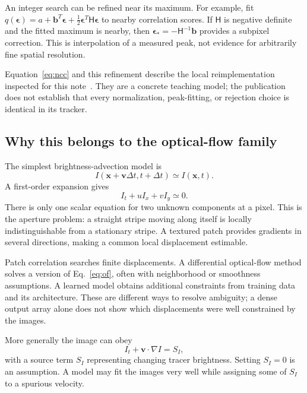 \documentclass[11pt]{article}
\newcommand{\vel}{\bm{v}}
\newcommand{\pos}{\bm{x}}
\begin{document}
An integer search can be refined near its maximum. For example, fit
$q(\bm{\epsilon})=a+\bm{b}^{T}\bm{\epsilon}
+\tfrac12\bm{\epsilon}^{T}\mathsf{H}\bm{\epsilon}$ to nearby correlation
scores. If $\mathsf{H}$ is negative definite and the fitted maximum is nearby,
then $\bm{\epsilon}_*=-\mathsf{H}^{-1}\bm{b}$ provides a subpixel correction.
This is interpolation of a measured peak, not evidence for arbitrarily fine
spatial resolution.

Equation~\eqref{eq:ncc} and this refinement describe the local
reimplementation inspected for this note~\cite{repotracker}. They are a
concrete teaching model; the publication does not establish that every
normalization, peak-fitting, or rejection choice is identical in its tracker.

\subsection{Why this belongs to the optical-flow family}

The simplest brightness-advection model is
\begin{equation}\label{eq:advect}
 I(\pos+\vel\Delta t,t+\Delta t)\simeq I(\pos,t).
\end{equation}
A first-order expansion gives
\begin{equation}\label{eq:of}
 I_t+uI_x+vI_y\simeq0.
\end{equation}
There is only one scalar equation for two unknown components at a pixel.
This is the aperture problem: a straight stripe moving along itself is
locally indistinguishable from a stationary stripe. A textured patch
provides gradients in several directions, making a common local displacement
estimable.

Patch correlation searches finite displacements. A differential optical-flow
method solves a version of Eq.~\eqref{eq:of}, often with neighborhood or
smoothness assumptions. A learned model obtains additional constraints from
training data and its architecture. These are different ways to resolve
ambiguity; a dense output array alone does not show which displacements were
well constrained by the images.

More generally the image can obey
\begin{equation}
 I_t+\vel\cdot\nabla I=S_I,
\end{equation}
with a source term $S_I$ representing changing tracer brightness. Setting
$S_I=0$ is an assumption. A model may fit the images very well while assigning
some of $S_I$ to a spurious velocity.
\end{document}
